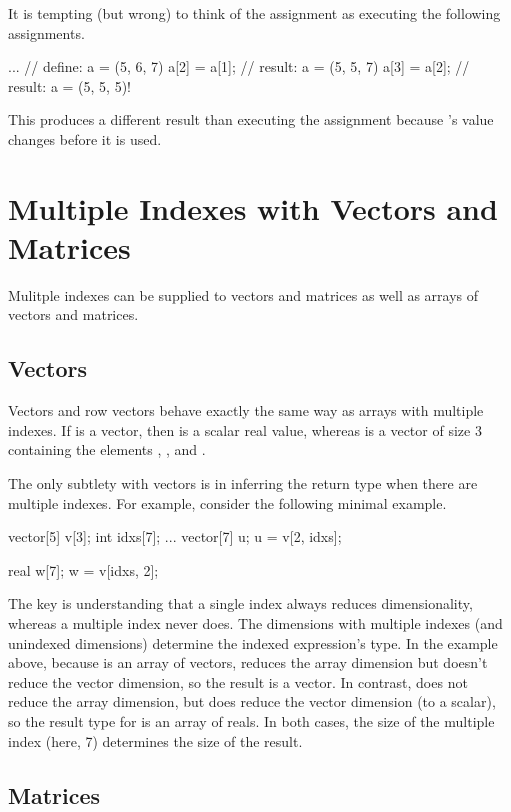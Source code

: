It is tempting (but wrong) to think of the assignment  as executing the following assignments.
%
\begin{stancode}
...                // define: a = (5, 6, 7)
a[2] = a[1];      // result: a = (5, 5, 7)
a[3] = a[2];      // result: a = (5, 5, 5)!
\end{stancode}
%
This produces a different result than executing the assignment because
's value changes before it is used.


\section{Multiple Indexes with Vectors and Matrices}

Mulitple indexes can be supplied to vectors and matrices as well as
arrays of vectors and matrices.

\subsection{Vectors}

Vectors and row vectors behave exactly the same way as arrays with
multiple indexes.  If  is a vector, then  is a
scalar real value, whereas  is a vector of size 3
containing the elements , , and .

The only subtlety with vectors is in inferring the return type when
there are multiple indexes. For example, consider the following
minimal example.
%
\begin{stancode}
vector[5] v[3];
int idxs[7];
...
vector[7] u;
u = v[2, idxs];

real w[7];
w = v[idxs, 2];
\end{stancode}
%
The key is understanding that a single index always reduces
dimensionality, whereas a multiple index never does.  The dimensions
with multiple indexes (and unindexed dimensions) determine the indexed
expression's type.  In the example above, because  is an array
of vectors,  reduces the array dimension but doesn't
reduce the vector dimension, so the result is a vector.  In contrast,
 does not reduce the array dimension, but does reduce
the vector dimension (to a scalar), so the result type for  is
an array of reals.  In both cases, the size of the multiple index
(here, 7) determines the size of the result.

\subsection{Matrices}

